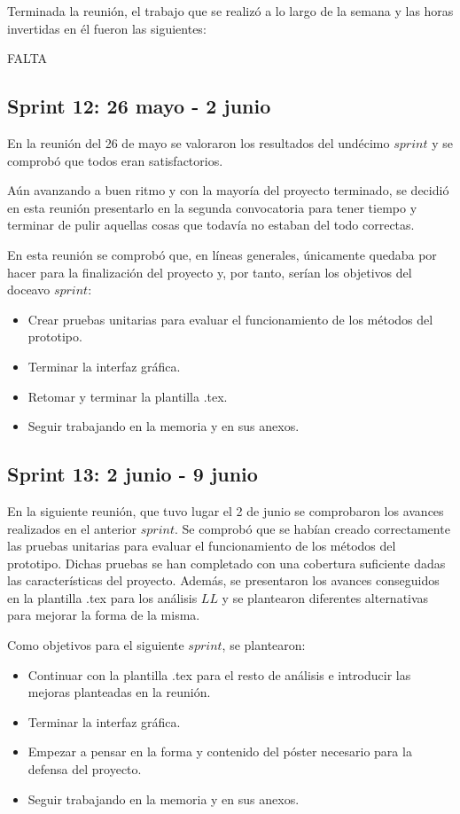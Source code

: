 Terminada la reunión, el trabajo que se realizó a lo largo de la semana y las horas invertidas en él fueron las siguientes:

FALTA
\subsection{Sprint 12: 26 mayo - 2 junio}
En la reunión del 26 de mayo se valoraron los resultados del undécimo $sprint$ y se comprobó que todos eran satisfactorios.

Aún avanzando a buen ritmo y con la mayoría del proyecto terminado, se decidió en esta reunión presentarlo en la segunda convocatoria para tener tiempo y terminar de pulir aquellas cosas que todavía no estaban del todo correctas.

En esta reunión se comprobó que, en líneas generales, únicamente quedaba por hacer para la finalización del proyecto y, por tanto, serían los objetivos del doceavo $sprint$:
\begin{itemize}
\item Crear pruebas unitarias para evaluar el funcionamiento de los métodos del prototipo.
\item Terminar la interfaz gráfica.
\item Retomar y terminar la plantilla .tex.
\item Seguir trabajando en la memoria y en sus anexos.
\end{itemize}


\subsection{Sprint 13: 2 junio - 9 junio}
En la siguiente reunión, que tuvo lugar el 2 de junio se comprobaron los avances realizados en el anterior $sprint$. Se comprobó que se habían creado correctamente las pruebas unitarias para evaluar el funcionamiento de los métodos del prototipo. Dichas pruebas se han completado con una cobertura suficiente dadas las características del proyecto. Además, se presentaron los avances conseguidos en la plantilla .tex para los análisis $LL$ y se plantearon diferentes alternativas para mejorar la forma de la misma.

Como objetivos para el siguiente $sprint$, se plantearon:
\begin{itemize}
\item Continuar con la plantilla .tex para el resto de análisis e introducir las mejoras planteadas en la reunión.
\item Terminar la interfaz gráfica.
\item Empezar a pensar en la forma y contenido del póster necesario para la defensa del proyecto.
\item Seguir trabajando en la memoria y en sus anexos.
\end{itemize}
